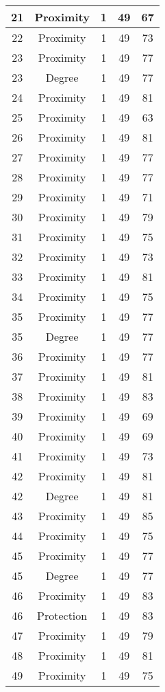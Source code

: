 \documentclass[results.tex]{subfiles}
\begin{document}
\begin{center}
\begin{tabular}{| c || c | c | c | c |}
    21 & Proximity & 1 & 49 & 67 \\ 
    \hline
    22 & Proximity & 1 & 49 & 73 \\ 
    \hline
    23 & Proximity & 1 & 49 & 77 \\ 
    \hline
    23 & Degree & 1 & 49 & 77 \\ 
    \hline
    24 & Proximity & 1 & 49 & 81 \\ 
    \hline
    25 & Proximity & 1 & 49 & 63 \\ 
    \hline
    26 & Proximity & 1 & 49 & 81 \\ 
    \hline
    27 & Proximity & 1 & 49 & 77 \\ 
    \hline
    28 & Proximity & 1 & 49 & 77 \\ 
    \hline
    29 & Proximity & 1 & 49 & 71 \\ 
    \hline
    30 & Proximity & 1 & 49 & 79 \\ 
    \hline
    31 & Proximity & 1 & 49 & 75 \\ 
    \hline
    32 & Proximity & 1 & 49 & 73 \\ 
    \hline
    33 & Proximity & 1 & 49 & 81 \\ 
    \hline
    34 & Proximity & 1 & 49 & 75 \\ 
    \hline
    35 & Proximity & 1 & 49 & 77 \\ 
    \hline
    35 & Degree & 1 & 49 & 77 \\ 
    \hline
    36 & Proximity & 1 & 49 & 77 \\ 
    \hline
    37 & Proximity & 1 & 49 & 81 \\ 
    \hline
    38 & Proximity & 1 & 49 & 83 \\ 
    \hline
    39 & Proximity & 1 & 49 & 69 \\ 
    \hline
    40 & Proximity & 1 & 49 & 69 \\ 
    \hline
    41 & Proximity & 1 & 49 & 73 \\ 
    \hline
    42 & Proximity & 1 & 49 & 81 \\ 
    \hline
    42 & Degree & 1 & 49 & 81 \\ 
    \hline
    43 & Proximity & 1 & 49 & 85 \\ 
    \hline
    44 & Proximity & 1 & 49 & 75 \\ 
    \hline
    45 & Proximity & 1 & 49 & 77 \\ 
    \hline
    45 & Degree & 1 & 49 & 77 \\ 
    \hline
    46 & Proximity & 1 & 49 & 83 \\ 
    \hline
    46 & Protection & 1 & 49 & 83 \\ 
    \hline
    47 & Proximity & 1 & 49 & 79 \\ 
    \hline
    48 & Proximity & 1 & 49 & 81 \\ 
    \hline
    49 & Proximity & 1 & 49 & 75 \\ 
    \hline   \end{tabular}
\end{center}
\end{document}
